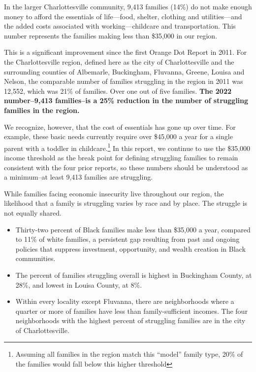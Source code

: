 \documentclass[
]{article}
\providecommand{\tightlist}{%
  \setlength{\itemsep}{0pt}\setlength{\parskip}{0pt}}
\begin{document}
In the larger Charlottesville community, 9,413 families (14\%) do not
make enough money to afford the essentials of life---food, shelter,
clothing and utilities---and the added costs associated with
working---childcare and transportation. This number represents the
families making less than \$35,000 in our region.

This is a significant improvement since the first Orange Dot Report in
2011. For the Charlottesville region, defined here as the city of
Charlottesville and the surrounding counties of Albemarle, Buckingham,
Fluvanna, Greene, Louisa and Nelson, the comparable number of families
struggling in the region in 2011 was 12,552, which was 21\% of families.
Over one out of five families. \textbf{The 2022 number--9,413
families--is a 25\% reduction in the number of struggling families in
the region.}

We recognize, however, that the cost of essentials has gone up over
time. For example, these basic needs currently require over \$45,000 a
year for a single parent with a toddler in childcare.\footnote{Assuming
  all families in the region match this ``model'' family type, 20\% of
  the families would fall below this higher threshold} In this report,
we continue to use the \$35,000 income threshold as the break point for
defining struggling families to remain consistent with the four prior
reports, so these numbers should be understood as a minimum--at least
9,413 families are struggling.

While families facing economic insecurity live throughout our region,
the likelihood that a family is struggling varies by race and by place.
The struggle is not equally shared.

\begin{itemize}
\tightlist
\item
  Thirty-two percent of Black families make less than \$35,000 a year,
  compared to 11\% of white families, a persistent gap resulting from
  past and ongoing policies that suppress investment, opportunity, and
  wealth creation in Black communities.
\item
  The percent of families struggling overall is highest in Buckingham
  County, at 28\%, and lowest in Louisa County, at 8\%.
\item
  Within every locality except Fluvanna, there are neighborhoods where a
  quarter or more of families have less than family-sufficient incomes.
  The four neighborhoods with the highest percent of struggling families
  are in the city of Charlottesville.
\end{itemize}
\end{document}
